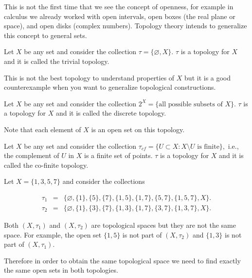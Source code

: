 \documentclass[
	fontsize=10pt, %
	twoside=false, %
	secnumdepth=1, %
]{kaobook}
\begin{document}
This is not the first time that we see the concept of openness, for example in calculus we already worked with open intervals, open boxes (the real plane or space), and open disks (complex numbers). Topology theory intends to generalize this concept to general sets.

\begin{example}
Let $X$ be any set and consider the collection $\tau=\{\varnothing, X\}.$ $\tau$ is a topology for $X$ and it is called the trivial topology. 

This is not the best topology to understand properties of $X$ but it is a good counterexample when you want to generalize topological constructions.
\end{example}

\begin{example}
Let $X$ be any set and consider the collection $2^X=\{\mbox{all possible subsets of } X\}.$ $\tau$ is a topology for $X$ and it is called the discrete topology. 

Note that each element of $X$ is an open set on this topology. 
\end{example}

\begin{example}
Let $X$ be any set and consider the collection $\tau_{cf}=\{U\subset X: X\setminus U \mbox{ is finite}\},$ i.e., the complement of $U$ in $X$ is a finite set of points. $\tau$ is a topology for $X$ and it is called the co-finite topology. 
\end{example}


\begin{example}
Let $X=\{1,3,5,7\}$ and consider the collections

\begin{eqnarray*}
\tau_1 &=& \{\varnothing, \{1\},\{5\},\{7\},\{1,5\},\{1,7\},\{5,7\},\{1,5,7\},X\}. \\
\tau_2 &=& \{\varnothing, \{1\},\{3\},\{7\},\{1,3\},\{1,7\},\{3,7\},\{1,3,7\},X\}.
\end{eqnarray*}

Both $(X,\tau_1)$ and $(X,\tau_2)$ are topological spaces but they are not the same space. For example, the open set $\{1,5\}$ is not part of $(X,\tau_2)$ and $\{1,3\}$  is not part of $(X,\tau_1).$ 

Therefore in order to obtain the same topological space we need to find exactly the same open sets in both topologies.
\end{example}
\end{document}
